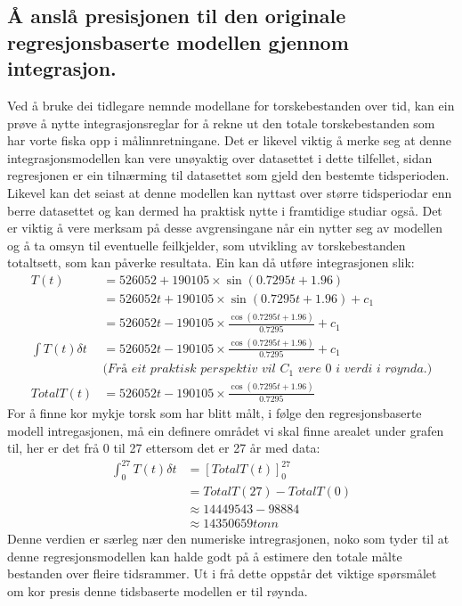 \documentclass{report}
\begin{document}
\subsection{Å anslå presisjonen til den originale regresjonsbaserte modellen gjennom integrasjon.}
Ved å bruke dei tidlegare nemnde modellane for torskebestanden over tid, kan ein prøve å nytte integrasjonsreglar for å rekne ut den totale torskebestanden som har vorte fiska opp i målinnretningane.
Det er likevel viktig å merke seg at denne integrasjonsmodellen kan vere unøyaktig over datasettet i dette tilfellet, sidan regresjonen er ein tilnærming til datasettet som gjeld den bestemte tidsperioden.
Likevel kan det seiast at denne modellen kan nyttast over større tidsperiodar enn berre datasettet og kan dermed ha praktisk nytte i framtidige studiar også.
Det er viktig å vere merksam på desse avgrensingane når ein nytter seg av modellen og å ta omsyn til eventuelle feilkjelder, som utvikling av torskebestanden totaltsett, som kan påverke resultata.
Ein kan då utføre integrasjonen slik:
\begin{align*} 
    T(t) &= 526052+190105\times \sin(0.7295t+1.96) \\
    &= 526052t+190105\times\sin(0.7295t+1.96)+c_{1} \\
    &= 526052t-190105\times\frac{\cos(0.7295t+1.96)}{0.7295}+c_{1} \\
    \int T(t)\delta t&=526052t-190105\times\frac{\cos(0.7295t+1.96)}{0.7295}+c_{1} \\
    & \textit{(Frå eit praktisk perspektiv vil $C_1$ vere 0 i verdi i røynda.)} \\
    TotalT(t)&=526052t-190105\times\frac{\cos(0.7295t+1.96)}{0.7295}
\end{align*}
For å finne kor mykje torsk som har blitt målt, i følge den regresjonsbaserte modell intregasjonen, må ein definere området vi skal finne arealet under grafen til, her er det frå 0 til 27 ettersom det er 27 år med data:
\begin{align*} 
    \int_{0}^{27}T(t) \delta t &= [TotalT(t)]_{0}^{27} \\
    &= TotalT(27)-TotalT(0) \\
    &\approx 14449543-98884\\
    &\approx 14350659tonn
\end{align*}
Denne verdien er særleg nær den numeriske intregrasjonen, noko som tyder til at denne regresjonsmodellen kan halde godt på å estimere den totale målte bestanden over fleire tidsrammer.
Ut i frå dette oppstår det viktige spørsmålet om kor presis denne tidsbaserte modellen er til røynda.
\end{document}
